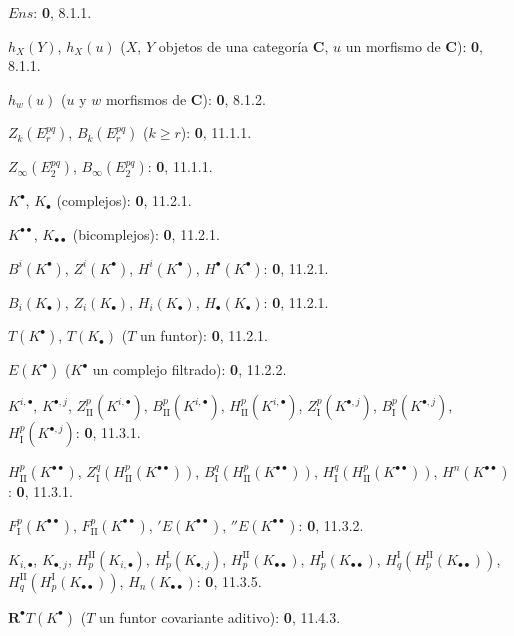 \documentclass[10pt,oneside,openany]{book}
\theoremstyle{egaenv}\newtheorem*{env}{---}
\theoremstyle{egastatement}
\theoremstyle{egadescription}
\renewcommand{\geq}{\geqslant}
\begin{document}
\begin{flushleft}
$\boldsymbol{\mathit{Ens}}$: \textbf 0, 8.1.1.

$h_X(Y)$, $h_X(u)$ ($X$, $Y$ objetos de una categoría $\boldsymbol{C}$, $u$ un morfismo
de $\boldsymbol{C}$): \textbf 0, 8.1.1.

$h_w(u)$ ($u$ y $w$ morfismos de $\boldsymbol{C}$): \textbf 0, 8.1.2.

$Z_k(E_r^{pq})$, $B_k(E_r^{pq})$ ($k\geq r$): \textbf 0, 11.1.1.

$Z_\infty(E_2^{pq})$, $B_\infty(E_2^{pq})$: \textbf 0, 11.1.1.

$K^\bullet$, $K_\bullet$ (complejos): \textbf 0, 11.2.1.

$K^{\bullet\bullet}$, $K_{\bullet\bullet}$ (bicomplejos): \textbf 0, 11.2.1.

$B^i(K^\bullet)$, $Z^i(K^\bullet)$, $H^i(K^\bullet)$,
$H^\bullet(K^\bullet)$: \textbf 0, 11.2.1.

$B_i(K_\bullet)$, $Z_i(K_\bullet)$, $H_i(K_\bullet)$,
$H_\bullet(K_\bullet)$: \textbf 0, 11.2.1.

$T(K^\bullet)$, $T(K_\bullet)$ ($T$ un funtor): \textbf 0, 11.2.1.

$E(K^\bullet)$ ($K^\bullet$ un complejo filtrado): \textbf 0, 11.2.2.

$K^{i,\bullet}$, $K^{\bullet,j}$, $Z_{\mathrm{II}}^p(K^{i,\bullet})$,
$B_{\mathrm{II}}^p(K^{i,\bullet})$, $H_{\mathrm{II}}^p(K^{i,\bullet})$,
$Z_{\mathrm I}^p(K^{\bullet,j})$, $B_{\mathrm I}^p(K^{\bullet,j})$,
$H_{\mathrm I}^p(K^{\bullet,j})$: \textbf 0, 11.3.1.

$H_{\mathrm{II}}^p(K^{\bullet\bullet})$,
$Z_{\mathrm I}^q(H_{\mathrm{II}}^p(K^{\bullet\bullet}))$,
$B_{\mathrm I}^q(H_{\mathrm{II}}^p(K^{\bullet\bullet}))$,
$H_{\mathrm I}^q(H_{\mathrm{II}}^p(K^{\bullet\bullet}))$,
$H^n(K^{\bullet\bullet})$: \textbf 0, 11.3.1.

$F_{\mathrm I}^p(K^{\bullet\bullet})$,
$F_{\mathrm{II}}^p(K^{\bullet\bullet})$, ${}'E(K^{\bullet\bullet})$,
${}''E(K^{\bullet\bullet})$: \textbf 0, 11.3.2.

$K_{i,\bullet}$, $K_{\bullet,j}$, $H_p^{\mathrm{II}}(K_{i,\bullet})$,
$H_p^{\mathrm I}(K_{\bullet,j})$, $H_p^{\mathrm{II}}(K_{\bullet\bullet})$,
$H_p^{\mathrm I}(K_{\bullet\bullet})$,
$H_q^{\mathrm I}(H_p^{\mathrm{II}}(K_{\bullet\bullet}))$,
$H_q^{\mathrm{II}}(H_p^{\mathrm I}(K_{\bullet\bullet}))$,
$H_n(K_{\bullet\bullet})$: \textbf 0, 11.3.5.

$\mathbf R^\bullet T(K^\bullet)$ ($T$ un funtor covariante aditivo): \textbf 0, 11.4.3.


\end{flushleft}
\end{document}
